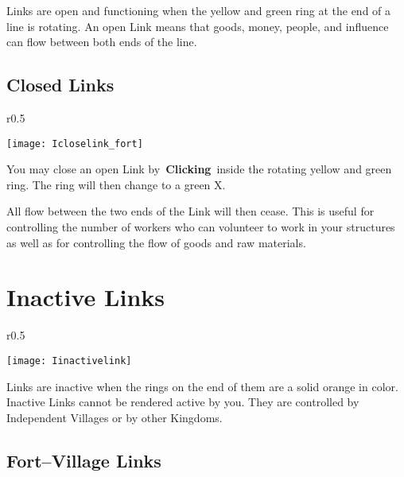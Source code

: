 Links are open and functioning when the yellow and green ring at the end of a line is rotating. An open Link means that goods, money, people, and influence can flow between both ends of the line.

\subsection{Closed Links}


\begin{wrapfigure}{r}{0.5\textwidth}
	\vspace{-20pt}
	\begin{center}
		\texttt{[image: Icloselink\_fort]}
	\end{center}
	\vspace{-5pt}
\end{wrapfigure}

You may close an open Link by \textbf{Clicking} inside the rotating yellow and green ring. The ring will then change to a green X.

All flow between the two ends of the Link will then cease. This is useful for controlling the number of workers who can volunteer to work in your structures as well as for controlling the flow of goods and raw materials.

\clearpage

\section{Inactive Links}


\begin{wrapfigure}{r}{0.5\textwidth}
	\vspace{-20pt}
	\begin{center}
		\texttt{[image: Iinactivelink]}
	\end{center}
	\vspace{-40pt}
\end{wrapfigure}

Links are inactive when the rings on the end of them are a solid orange in color. Inactive Links cannot be rendered active by you. They are controlled by Independent Villages or by other Kingdoms. 

\subsection{Fort–Village Links}

